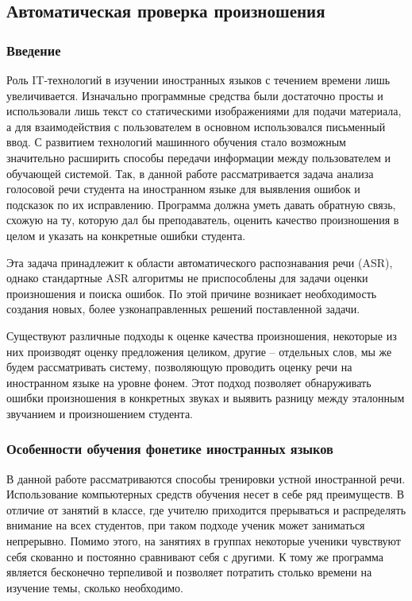 \subsection{Автоматическая проверка произношения}

\subsubsection{Введение}
Роль IT-технологий в изучении иностранных языков с течением времени лишь увеличивается. Изначально программные средства были достаточно просты и использовали лишь текст со статическими изображениями для подачи материала, а для взаимодействия с пользователем в основном использовался письменный ввод. С развитием технологий машинного обучения стало возможным значительно расширить способы передачи информации между пользователем и обучающей системой. Так, в данной работе рассматривается задача анализа голосовой речи студента на иностранном языке для выявления ошибок и подсказок по их исправлению. Программа должна уметь давать обратную связь, схожую на ту, которую дал бы преподаватель, оценить качество произношения в целом и указать на конкретные ошибки студента.

Эта задача принадлежит к области автоматического распознавания речи (ASR), однако стандартные ASR алгоритмы не приспособлены для задачи оценки произношения и поиска ошибок. По этой причине возникает необходимость создания новых, более узконаправленных решений поставленной задачи.

Существуют различные подходы к оценке качества произношения, некоторые из них производят оценку предложения целиком, другие -- отдельных слов, мы же будем рассматривать систему, позволяющую проводить оценку речи на иностранном языке на уровне фонем. Этот подход позволяет обнаруживать ошибки произношения в конкретных звуках и выявить разницу между эталонным звучанием и произношением студента.

\subsubsection{Особенности обучения фонетике иностранных языков}
В данной работе рассматриваются способы тренировки устной иностранной речи. Использование компьютерных средств обучения несет в себе ряд преимуществ. В отличие от занятий в классе, где учителю приходится прерываться и распределять внимание на всех студентов, при таком подходе ученик может заниматься непрерывно. Помимо этого, на занятиях в группах некоторые ученики чувствуют себя скованно и постоянно сравнивают себя с другими. К тому же программа является бесконечно терпеливой и позволяет потратить столько времени на изучение темы, сколько необходимо.

